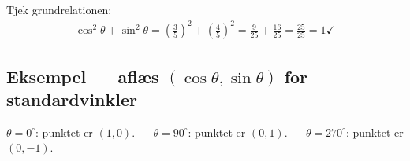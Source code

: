 \noindent
Tjek grundrelationen:
\begin{align*}
  \cos^{2}\theta+\sin^{2}\theta = (\tfrac{3}{5})^{2}+(\tfrac{4}{5})^{2}
    = \tfrac{9}{25}+\tfrac{16}{25} = \tfrac{25}{25} = 1 \checkmark
\end{align*}


\subsection*{Eksempel --- aflæs $(\cos\theta,\sin\theta)$ for standardvinkler}

\noindent
$\theta=0^{\circ}$: punktet er $(1,0)$. $\quad$ $\theta=90^{\circ}$: punktet er $(0,1)$. $\quad$ $\theta=270^{\circ}$: punktet er $(0,-1)$.
